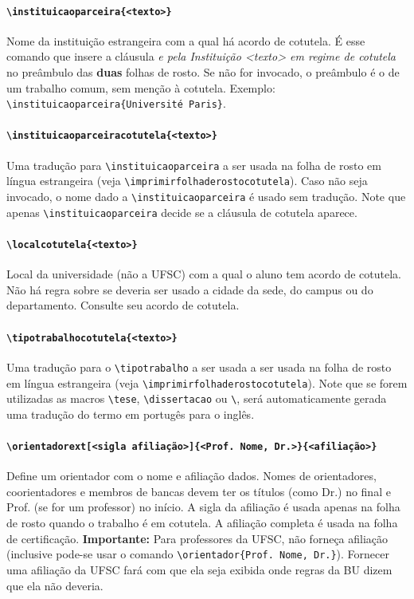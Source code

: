 \documentclass[embeddedlogo]{ufsc-thesis-rn46-2019}
\newcommand{\lacmd}[1]{\texttt{\textbackslash{}#1}}
\begin{document}
\paragraph*{\lacmd{instituicaoparceira\{<texto>\}}} Nome da instituição
estrangeira com a qual há acordo de cotutela. É esse comando que insere a
cláusula \emph{e pela Instituição <texto> em regime de cotutela} no preâmbulo
das \textbf{duas} folhas de rosto. Se não for invocado, o preâmbulo é o de um
trabalho comum, sem menção à cotutela. Exemplo:
\lacmd{instituicaoparceira\{Université Paris\}}.

\paragraph*{\lacmd{instituicaoparceiracotutela\{<texto>\}}} Uma tradução para
\lacmd{instituicaoparceira} a ser usada na folha de rosto em língua estrangeira
(veja \lacmd{imprimirfolhaderostocotutela}). Caso não seja invocado, o nome
dado a \lacmd{instituicaoparceira} é usado sem tradução. Note que apenas
\lacmd{instituicaoparceira} decide se a cláusula de cotutela aparece.

\paragraph*{\lacmd{localcotutela\{<texto>\}}} Local da universidade (não a UFSC)
com a qual o aluno tem acordo de cotutela. Não há regra sobre se deveria ser
usado a cidade da sede, do campus ou do departamento. Consulte seu acordo de
cotutela.

\paragraph*{\lacmd{tipotrabalhocotutela\{<texto>\}}} Uma tradução para o
\lacmd{tipotrabalho} a ser usada a ser usada na folha de rosto em língua
estrangeira (veja \lacmd{imprimirfolhaderostocotutela}). Note que se forem
utilizadas as macros \lacmd{tese}, \lacmd{dissertacao} ou \lacmd{\tcc}, será
automaticamente gerada uma tradução do termo em portugês para o inglês.

\paragraph*{\lacmd{orientadorext[<sigla afiliação>]\{<Prof. Nome, Dr.>\}\{<afiliação>\}}}
Define um orientador com o nome e afiliação dados. Nomes de orientadores,
coorientadores e membros de bancas devem ter os títulos (como Dr.) no final e
Prof. (se for um professor) no início. A sigla da afiliação é usada apenas na
folha de rosto quando o trabalho é em cotutela. A afiliação completa é usada na
folha de certificação. \textbf{Importante:} Para professores da UFSC, não
forneça afiliação (inclusive pode-se usar o comando \lacmd{orientador\{Prof.
Nome, Dr.\}}). Fornecer uma afiliação da UFSC fará com que ela seja exibida
onde regras da BU dizem que ela não deveria.
\end{document}
